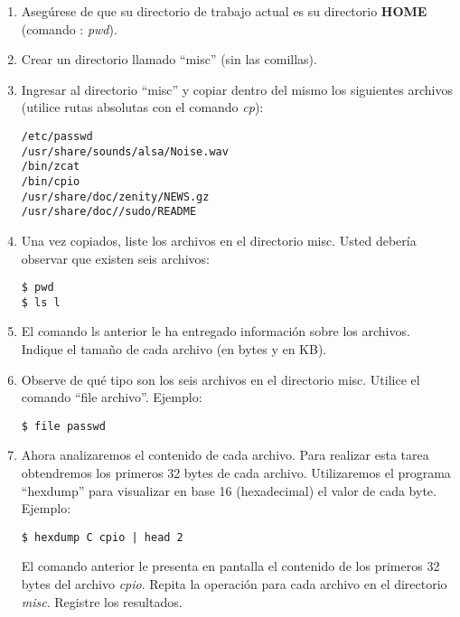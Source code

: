 \documentclass[12pt]{article}
\begin{document}
\begin{enumerate}

    \item Asegúrese de que su directorio de trabajo actual es su directorio
        \textbf{HOME} (comando : \emph{pwd}).

    \item Crear un directorio llamado ``misc'' (sin las comillas).

    \item Ingresar al directorio ``misc'' y copiar dentro del mismo los
        siguientes archivos (utilice rutas absolutas con el comando \emph{cp}):

\begin{verbatim}
/etc/passwd
/usr/share/sounds/alsa/Noise.wav
/bin/zcat
/bin/cpio
/usr/share/doc/zenity/NEWS.gz
/usr/share/doc//sudo/README
\end{verbatim}

    \item Una vez copiados, liste los archivos en el directorio misc. Usted
        debería observar que existen seis archivos:

        \begin{verbatim}
$ pwd 
$ ls ­l
        \end{verbatim}

    \item El comando ls anterior le ha entregado información sobre los
        archivos.  Indique el tamaño de cada archivo (en bytes y en KB).

    \item Observe de qué tipo son los seis archivos en el directorio misc.
        Utilice el comando ``file archivo''. Ejemplo:

        \begin{verbatim}
$ file passwd
        \end{verbatim}

    \item Ahora analizaremos el contenido de cada archivo. Para realizar esta
        tarea obtendremos los primeros 32 bytes de cada archivo. Utilizaremos
        el programa ``hexdump'' para visualizar en base 16 (hexadecimal) el
        valor de cada byte. Ejemplo:

        \begin{verbatim}
$ hexdump ­C cpio | head ­2
        \end{verbatim}

        El comando anterior le presenta en pantalla el contenido de los
        primeros 32 bytes del archivo \emph{cpio}. Repita la operación para
        cada archivo en el directorio \emph{misc}. Registre los resultados.


\end{enumerate}
\end{document}

